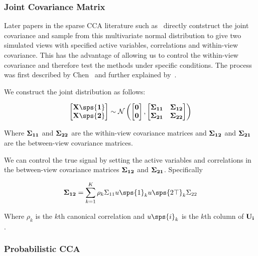\subsubsection{Joint Covariance Matrix}
Later papers in the sparse CCA literature such as~\cite{mai2019iterative,chen2013sparse} directly contstruct the joint covariance and sample from this multivariate normal distribution to give two simulated views with specified active variables, correlations and within-view covariance.
This has the advantage of allowing us to control the within-view covariance and therefore test the methods under specific conditions.
The process was first described by Chen~\cite{chen2013sparse} and further explained by~\cite{suo2017sparse}.

We construct the joint distribution as follows:

\begin{align}\label{eq:covariance}
    \begin{bmatrix} \bold{X\sps{1}} \\ \bold{X\sps{2}} \end{bmatrix} \sim \mathcal{N} \left( \begin{bmatrix} \bold{0} \\ \bold{0} \end{bmatrix}, \begin{bmatrix} \bold{\Sigma_{11}} & \bold{\Sigma_{12}} \\ \bold{\Sigma_{21}} & \bold{\Sigma_{22}} \end{bmatrix} \right)
\end{align}

Where $\bold{\Sigma_{11}}$ and $\bold{\Sigma_{22}}$ are the within-view covariance matrices and $\bold{\Sigma_{12}}$ and $\bold{\Sigma_{21}}$ are the between-view covariance matrices.

We can control the true signal by setting the active variables and correlations in the between-view covariance
matrices $\bold{\Sigma_{12}}$ and $\bold{\Sigma_{21}}$. Specifically

\begin{align}
    \bold{\Sigma_{12}}=\sum_{k=1}^{K}\rho_k\Sigma_{11}u\sps{1}_{k}u\sps{2\top}_k\Sigma_{22}
\end{align}

Where $\rho_k$ is the $k$th canonical correlation and $u\sps{i}_k$ is the $k$th column of $\bold{U_i}$.

\subsubsection{Probabilistic CCA}

